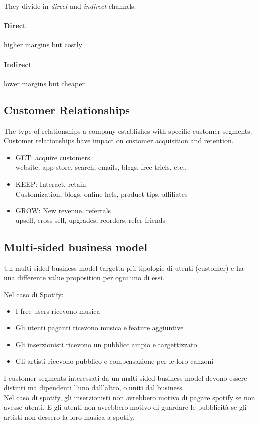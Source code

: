 \documentclass{article}
\begin{document}
They divide in \textit{direct} and \textit{indirect} channels.
\paragraph{Direct} higher margins but costly
\paragraph{Indirect} lower margins but cheaper

\subsection{Customer Relationships}
The type of relationships a company establishes with specific customer segments. Customer relationships have impact on customer acquisition and retention.

\begin{itemize}
    \item GET: acquire customers \\
        website, app store, search, emails, blogs, free triels, etc..
    \item KEEP: Interact, retain \\
        Customization, blogs, online hels, product tips, affiliates
    \item GROW: New revenue, referrals \\
        upsell, cross sell, upgrades, reorders, refer friends
\end{itemize}

\subsection{Multi-sided business model}
Un multi-sided business model targetta più tipologie di utenti (customer) e ha una differente value proposition per ogni uno di essi.

Nel caso di Spotify: \begin{itemize}
    \item I free users ricevono musica
    \item Gli utenti paganti ricevono musica e feature aggiuntive
    \item Gli inserzionisti ricevono un pubblico ampio e targettizzato 
    \item Gli artisti ricevono pubblico e compensazione per le loro canzoni
\end{itemize}

I customer segments interessati da un multi-sided business model devono essere distinti ma dipendenti l'uno dall'altro, o uniti dal business. \\
Nel caso di spotify, gli inserzionisti non avrebbero motivo di pagare spotify se non avesse utenti. E gli utenti non avrebbero motivo di guardare le pubblicità se gli artisti non dessero la loro musica a spotify. 
\end{document}
